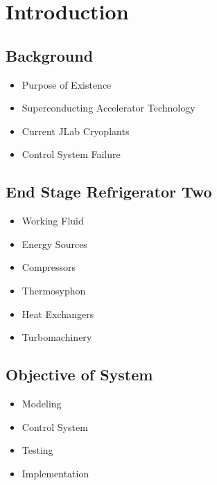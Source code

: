 \chapter{Introduction}
\section{Background}
\begin{itemize}
\item Purpose of Existence
\item Superconducting Accelerator Technology
\item Current JLab Cryoplants
\item Control System Failure
\end{itemize}
\section{End Stage Refrigerator Two}
\begin{itemize}
\item Working Fluid
\item Energy Sources
\item Compressors
\item Thermosyphon
\item Heat Exchangers
\item Turbomachinery
\end{itemize}
\section{Objective of System}
\begin{itemize}
\item Modeling
\item Control System
\item Testing
\item Implementation
\end{itemize}